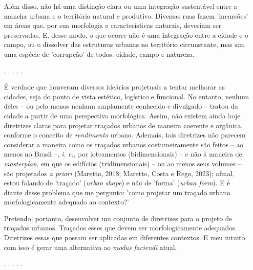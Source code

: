 \documentclass[]{report}
\begin{document}
	Além disso, não há uma distinção clara ou uma integração sustentável entre a mancha urbana e o território natural e produtivo. Diversas ruas fazem 'incursões' em áreas que, por sua morfologia e características naturais, deveriam ser preservadas. E, desse modo, o que ocorre não é uma integração entre a cidade e o campo, ou o dissolver das estruturas urbanas no território circunstante, mas sim uma espécie de 'corrupção' de todos: cidade, campo e natureza.

	\begin{center}
		. . . . .
	\end{center}

	É verdade que houveram diversos ideários projetuais a tentar melhorar as cidades, seja do ponto de vista estético, logístico e funcional. No entanto, nenhum deles – ou pelo menos nenhum amplamente conhecido e divulgado – tratou da cidade a partir de uma perspectiva morfológica. Assim, não existem ainda hoje diretrizes claras para projetar traçados urbanos de maneira coerente e orgânica, conforme o conceito de \textit{rendimento} urbano. %
	Ademais, tais diretrizes não parecem considerar a maneira como os traçados urbanos costumeiramente são feitos – ao menos no Brasil –, \textit{i. e.,} por loteamentos (bidimensionais) – e não à maneira de \textit{masterplan}, em que os edifícios (tridimensionais) – ou ao menos seus volumes – são projetados \textit{a priori} (Maretto, 2018; Maretto, Costa e Rego, 2023); afinal, estou falando de 'traçado' (\textit{urban shape}) e não de 'forma' (\textit{urban form}). E é diante desse problema que me pergunto: 'como projetar um traçado urbano morfologicamente adequado ao contexto?'

	Pretendo, portanto, desenvolver um conjunto de diretrizes para o projeto de traçados urbanos. Traçados esses que devem ser morfologicamente adequados. Diretrizes essas que possam ser aplicadas em diferentes contextos. E meu intuito com isso é gerar uma alternativa ao \textit{modus faciendi} atual. 
	
	\begin{center}
		. . . . .
	\end{center}
\end{document}
